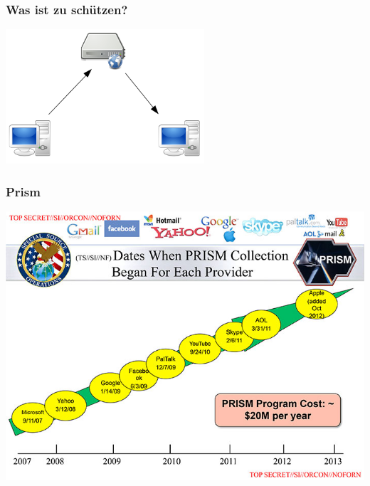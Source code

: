 \documentclass[12pt, xcolor={svgnames,table}]{beamer}
\begin{document}
\begin{frame}
    \frametitle{Was ist zu schützen?}
    \begin{center}
      \includegraphics[height=5cm]{img/c-s.png}
    \end{center}
\end{frame}

\begin{frame}
    \frametitle{Prism}
    \begin{center}
      \includegraphics[height=0.7\textheight]{img/prism.jpg}
    \end{center}
\end{frame}
\end{document}
